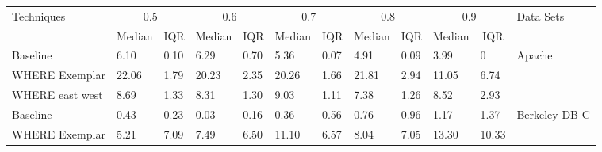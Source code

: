 \documentclass{sig-alternative}
\begin{document}
\begin{table}
\centering
{}

\begin{tabular}{|l|l|l|l|l|l|l|l|l|l|ll|}
\hline
\multirow{2}{*}{Techniques}           & \multicolumn{2}{c|}{0.5}                               & \multicolumn{2}{c|}{0.6}                               & \multicolumn{2}{c|}{0.7}                               & \multicolumn{2}{c|}{0.8}                               & \multicolumn{2}{c|}{0.9}                                         & Data Sets                                 \\ \cline{2-11}
                                      & \multicolumn{1}{c|}{Median} & \multicolumn{1}{c|}{IQR} & \multicolumn{1}{c|}{Median} & \multicolumn{1}{c|}{IQR} & \multicolumn{1}{c|}{Median} & \multicolumn{1}{c|}{IQR} & \multicolumn{1}{c|}{Median} & \multicolumn{1}{c|}{IQR} & \multicolumn{1}{c|}{Median} & \multicolumn{1}{c|}{IQR}            &                                           \\ \hline
\multicolumn{1}{|l|}{Baseline}        & 6.10                & 0.10             & 6.29                & 0.70             & 5.36                & 0.07             & 4.91                & 0.09             & 3.99                & \multicolumn{1}{l|}{0}             & \multirow{3}{*}{Apache}                   \\
\multicolumn{1}{|l|}{WHERE Exemplar}  & 22.06               & 1.79             & 20.23               & 2.35             & 20.26               & 1.66             & 21.81               & 2.94             & 11.05               & \multicolumn{1}{l|}{\cellcolor[HTML]{9B9B9B}6.74}  &                                           \\
\multicolumn{1}{|l|}{WHERE east west} & 8.69                & 1.33             & 8.31                & 1.30             & 9.03                & 1.11              & 7.38                & 1.26             & 8.52                & \multicolumn{1}{l|}{2.93}  &                                           \\ \hline
\multicolumn{1}{|l|}{Baseline}        & 0.43                & 0.23             & 0.03                & 0.16             & 0.36                & 0.56             & 0.76                & 0.96             & 1.17                & \multicolumn{1}{l|}{1.37}  & \multirow{3}{*}{Berkeley DB C}            \\
\multicolumn{1}{|l|}{WHERE Exemplar}  & 5.21                & \cellcolor[HTML]{9B9B9B}7.09             & 7.49                & \cellcolor[HTML]{9B9B9B}6.50             & 11.10               & \cellcolor[HTML]{9B9B9B}6.57            & 8.04                 & \cellcolor[HTML]{9B9B9B}7.05             & 13.30               & \multicolumn{1}{l|}{\cellcolor[HTML]{9B9B9B}10.33} &                                           \\

\end{tabular}
\end{table}
\end{document}
